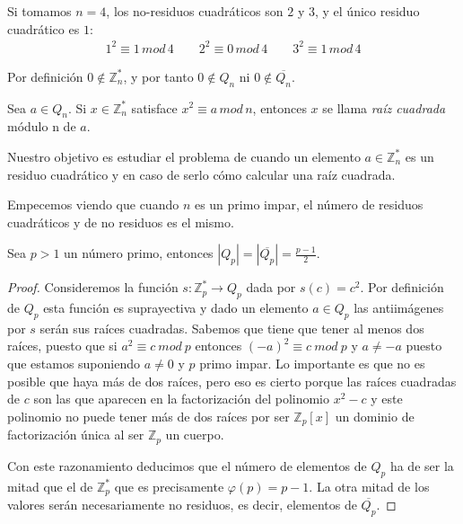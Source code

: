 \begin{example}
	Si tomamos $n=4$, los no-residuos cuadráticos son $2$ y $3$, y el único residuo cuadrático es $1$:
	\begin{align*}
		1^2 \equiv 1 \, mod \, 4 \qquad 2^2 \equiv 0 \, mod \, 4 \qquad  3^2 \equiv 1 \, mod \, 4
	\end{align*}
\end{example}


\begin{remark}
	Por definición $0 \notin \mathbb{Z}^*_n$, y por tanto $0 \notin Q_n$ ni $0 \notin \overline{Q_n}$.
\end{remark}

\begin{definition}
	Sea $a \in Q_n$. Si $x \in \mathbb{Z}^*_n$ satisface $ x^2 \equiv a \, mod \, n$,
	entonces $x$ se llama \textit{raíz cuadrada} módulo n de $a$.
\end{definition}

Nuestro objetivo es estudiar el problema de cuando
un elemento $a \in {\mathbb Z}_n^*$ es un residuo cuadr\'atico y en caso de serlo
c\'omo calcular una ra\'iz cuadrada.

Empecemos viendo que cuando $n$ es un primo impar, el n\'umero de residuos cuadr\'aticos y de no residuos es el mismo.

\begin{proposition}
Sea $p>1$ un n\'umero primo, entonces $|Q_p| = |\overline{Q_p}| = \frac{p-1}{2}$.
\end{proposition}
\begin{proof}
Consideremos la funci\'on $s: {\mathbb Z}_p^* \to Q_p$ dada por $s(c) = c^2$. Por definici\'on de $Q_p$ esta funci\'on es suprayectiva y dado un elemento $a \in Q_p$ las antiim\'agenes por $s$ ser\'an sus ra\'ices cuadradas. Sabemos que tiene que tener al menos dos ra\'ices, puesto que si $a^2 \equiv c ~mod~p$ entonces $(-a)^2 \equiv c ~mod~p$ y $a\not=-a$ puesto que estamos suponiendo $a \not=0$ y $p$ primo impar.
Lo importante es que no es posible que haya m\'as de dos ra\'ices, pero eso es cierto porque las ra\'ices cuadradas de $c$ son las que aparecen en la factorizaci\'on del polinomio
$x^2-c$ y este polinomio no puede tener m\'as de dos ra\'ices por ser ${\mathbb Z}_p[x]$ un dominio de factorizaci\'on \'unica al ser ${\mathbb Z}_p$ un cuerpo.

Con este razonamiento deducimos que el n\'umero de elementos de $Q_p$ ha de ser la mitad que el de ${\mathbb Z}_p^*$ que es precisamente $\varphi(p) = p-1$. La otra mitad de los
valores ser\'an necesariamente no residuos, es decir, elementos de $\overline{Q_p}$.
\end{proof}

